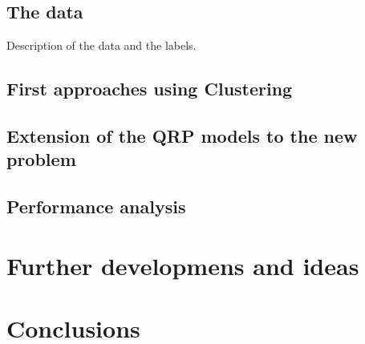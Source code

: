 \documentclass[a4paper]{book}
\begin{document}
\section{The data}
Description of the data and the labels.
\section{First approaches using Clustering}
\section{Extension of the QRP models to the new problem}
\section{Performance analysis}
\chapter{Further developmens and ideas}
\chapter{Conclusions}


%
%
%
%
%
%
%
%
%
%
%
%
%
%
%
\end{document}

